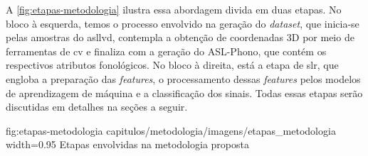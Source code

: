 











A \autoref{fig:etapas-metodologia} ilustra essa abordagem divida em duas etapas.
No bloco à esquerda, temos o processo envolvido na geração do \textit{dataset}, que inicia-se pelas amostras do \acrshort{asllvd}, contempla a obtenção de coordenadas 3D por meio de ferramentas de \acrshort{cv} e finaliza com a geração do ASL-Phono, que contém os respectivos atributos fonológicos.
No bloco à direita, está a etapa de \acrlong{slr}, que engloba a preparação das \textit{features}, o processamento dessas \textit{features} pelos modelos de aprendizagem de máquina e a classificação dos sinais.
Todas essas etapas serão discutidas em detalhes na seções a seguir.

\figura
{fig:etapas-metodologia}
{capitulos/metodologia/imagens/etapas_metodologia}
{width=0.95\textwidth}
{Etapas envolvidas na metodologia proposta}
{}












